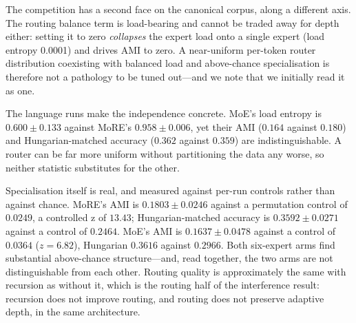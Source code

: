 The competition has a second face on the canonical corpus, along a different axis.
The routing balance term is load-bearing and cannot be traded away for depth
either: setting it to zero \emph{collapses} the expert load onto a single expert
(load entropy 0.0001) and drives AMI to zero. A near-uniform per-token router
distribution coexisting with balanced load and above-chance specialisation is
therefore not a pathology to be tuned out---and we note that we initially read it
as one.

The language runs make the independence concrete. MoE's load entropy is
$0.600 \pm 0.133$ against MoRE's $0.958 \pm 0.006$, yet their AMI ($0.164$ against
$0.180$) and Hungarian-matched accuracy ($0.362$ against $0.359$) are
indistinguishable. A router can be far more uniform without partitioning the data
any worse, so neither statistic substitutes for the other.

Specialisation itself is real, and measured against per-run controls rather than
against chance. MoRE's AMI is $0.1803 \pm 0.0246$ against a permutation control of
$0.0249$, a controlled z of $13.43$; Hungarian-matched accuracy is $0.3592 \pm
0.0271$ against a control of $0.2464$. MoE's AMI is $0.1637 \pm 0.0478$ against a
control of $0.0364$ ($z = 6.82$), Hungarian $0.3616$ against $0.2966$. Both
six-expert arms find substantial above-chance structure---and, read together, the
two arms are not distinguishable from each other. Routing quality is approximately
the same with recursion as without it, which is the routing half of the
interference result: recursion does not improve routing, and routing does not
preserve adaptive depth, in the same architecture.

